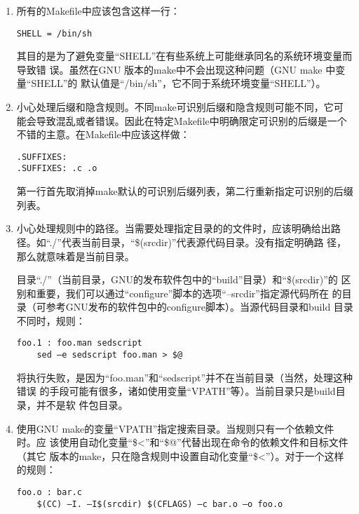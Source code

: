 \begin{enumerate}
  \item 所有的Makefile中应该包含这样一行：

\begin{Verbatim}[]
SHELL = /bin/sh
\end{Verbatim}


  其目的是为了避免变量“SHELL”在有些系统上可能继承同名的系统环境变量而导致错
      误。虽然在GNU 版本的make中不会出现这种问题（GNU make 中变量“SHELL”的
      默认值是“/bin/sh”，它不同于系统环境变量“SHELL”）。

  \item 小心处理后缀和隐含规则。不同make可识别后缀和隐含规则可能不同，它可
      能会导致混乱或者错误。因此在特定Makefile中明确限定可识别的后缀是一个
      不错的主意。在Makefile中应该这样做：

\begin{Verbatim}[]
.SUFFIXES:
.SUFFIXES: .c .o
\end{Verbatim}

第一行首先取消掉make默认的可识别后缀列表，第二行重新指定可识别的后缀列表。

  \item 小心处理规则中的路径。当需要处理指定目录的的文件时，应该明确给出路
      径。如“./”代表当前目录，“\$(srcdir)”代表源代码目录。没有指定明确路
      径，那么就意味着是当前目录。

      目录“./”（当前目录，GNU的发布软件包中的“build”目录）和“\$(srcdir)”的
      区别和重要，我们可以通过“configure”脚本的选项“--srcdir”指定源代码所在
      的目录（可参考GNU发布的软件包中的configure脚本）。当源代码目录和build
      目录不同时，规则：

\begin{Verbatim}[]
foo.1 : foo.man sedscript
    sed –e sedscript foo.man > $@
\end{Verbatim}

将执行失败，是因为“foo.man”和“sedscript”并不在当前目录（当然，处理这种错误
的手段可能有很多，诸如使用变量“VPATH”等）。当前目录只是build目录，并不是软
件包目录。

  \item 使用GNU make的变量“VPATH”指定搜索目录。当规则只有一个依赖文件时。应
      该使用自动化变量“\$<”和“\$@”代替出现在命令的依赖文件和目标文件（其它
      版本的make，只在隐含规则中设置自动化变量“\$<”）。对于一个这样的规则：

\begin{Verbatim}[]
foo.o : bar.c
    $(CC) –I. –I$(srcdir) $(CFLAGS) –c bar.o –o foo.o
\end{Verbatim}


\end{enumerate}
